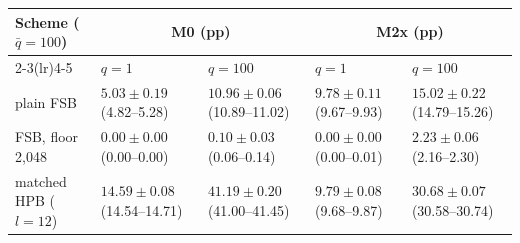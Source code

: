 \begin{tabular}{lllll}
\toprule
Scheme ($\bar q=100$) & \multicolumn{2}{c}{M0 (pp)} & \multicolumn{2}{c}{M2x (pp)} \\
\cmidrule(lr){2-3}\cmidrule(lr){4-5}
 & $q=1$ & $q=100$ & $q=1$ & $q=100$ \\
\midrule
plain FSB & $5.03 \pm 0.19$ (4.82--5.28) & $10.96 \pm 0.06$ (10.89--11.02) & $9.78 \pm 0.11$ (9.67--9.93) & $15.02 \pm 0.22$ (14.79--15.26) \\
FSB, floor 2,048 & $0.00 \pm 0.00$ (0.00--0.00) & $0.10 \pm 0.03$ (0.06--0.14) & $0.00 \pm 0.00$ (0.00--0.01) & $2.23 \pm 0.06$ (2.16--2.30) \\
matched HPB ($l=12$) & $14.59 \pm 0.08$ (14.54--14.71) & $41.19 \pm 0.20$ (41.00--41.45) & $9.79 \pm 0.08$ (9.68--9.87) & $30.68 \pm 0.07$ (30.58--30.74) \\
\bottomrule
\end{tabular}
